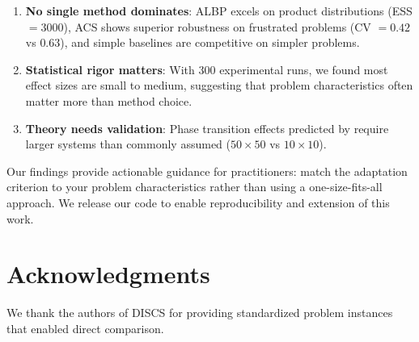 \documentclass{article}
\begin{document}
\begin{enumerate}
    \item \textbf{No single method dominates}: ALBP excels on product distributions (ESS $= 3000$), ACS shows superior robustness on frustrated problems (CV $= 0.42$ vs $0.63$), and simple baselines are competitive on simpler problems.
    
    \item \textbf{Statistical rigor matters}: With 300 experimental runs, we found most effect sizes are small to medium, suggesting that problem characteristics often matter more than method choice.
    
    \item \textbf{Theory needs validation}: Phase transition effects predicted by \citet{roberts2001optimal} require larger systems than commonly assumed ($50 \times 50$ vs $10 \times 10$).
\end{enumerate}

Our findings provide actionable guidance for practitioners: match the adaptation criterion to your problem characteristics rather than using a one-size-fits-all approach. We release our code to enable reproducibility and extension of this work.

\section*{Acknowledgments}

We thank the authors of DISCS \citep{goshvadi2023discs} for providing standardized problem instances that enabled direct comparison.
\end{document}
